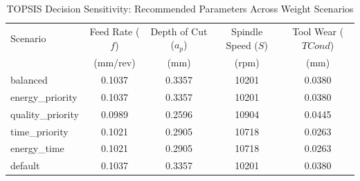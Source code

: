 \begin{table}[htbp]
\centering
\caption{TOPSIS Decision Sensitivity: Recommended Parameters Across Weight Scenarios}
\label{tab:topsis_sensitivity}
\begin{tabular}{lcccc}
\toprule
Scenario & Feed Rate ($f$) & Depth of Cut ($a_p$) & Spindle Speed ($S$) & Tool Wear ($TCond$) \\
 & (mm/rev) & (mm) & (rpm) & (mm) \\
\midrule
balanced & 0.1037 & 0.3357 & 10201 & 0.0380 \\
energy\_priority & 0.1037 & 0.3357 & 10201 & 0.0380 \\
quality\_priority & 0.0989 & 0.2596 & 10904 & 0.0445 \\
time\_priority & 0.1021 & 0.2905 & 10718 & 0.0263 \\
energy\_time & 0.1021 & 0.2905 & 10718 & 0.0263 \\
default & 0.1037 & 0.3357 & 10201 & 0.0380 \\
\bottomrule
\end{tabular}
\end{table}